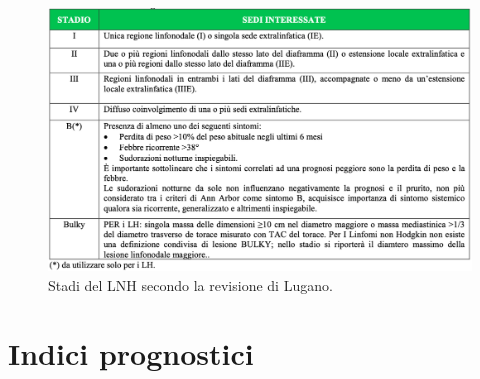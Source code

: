 \begin{figure}[H]
    \begin{center}
    \includegraphics[width=0.95\columnwidth]{img/LUGANOAIOM.png}
    \vspace{-3mm}
    \end{center}
    \caption{Stadi del LNH secondo la revisione di Lugano.
    \cite{AIOM}}
    
\end{figure}


\section{Indici prognostici}

